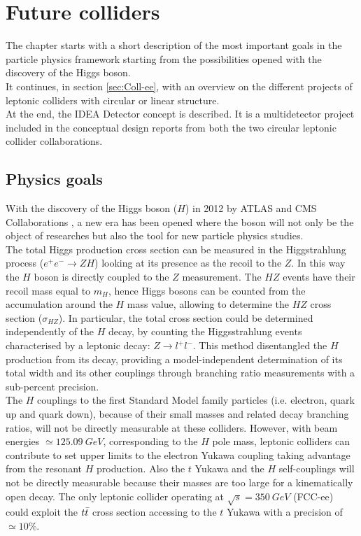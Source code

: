\chapter{Future colliders}
The chapter starts with a short description of the most important goals in the particle physics framework starting from the possibilities opened with the discovery of the Higgs boson.\\
It continues, in section \ref{sec:Coll-ee}, with an overview on the different projects of leptonic colliders with circular or linear structure.\\
At the end, the IDEA Detector concept is described. It is a multidetector project included in the conceptual design reports from both the two circular leptonic collider collaborations.

\section{Physics goals}
With the discovery of the Higgs boson ($H$) in 2012 by ATLAS and CMS Collaborations \cite{ATLAS_H, CMS_H}, a new era has been opened where the boson will not only be the object of researches but also the tool for new particle physics studies.\\

The total Higgs production cross section can be measured in the Higgstrahlung process ($e^+ e^- \rightarrow Z H$) looking at its presence as the recoil to the $Z$. In this way the $H$ boson is directly coupled to the $Z$ measurement.
The $H Z$ events have their recoil mass equal to $m_H$, hence Higgs bosons can be counted from the accumulation around the $H$ mass value, allowing to determine the $H Z$ cross section ($\sigma_{HZ}$).
In particular, the total cross section could be determined independently of the $H$ decay, by counting the Higgsstrahlung events characterised by a leptonic decay: $Z \rightarrow l^+ l^-$.
This method disentangled the $H$ production from its decay, providing a model-independent determination of its total width and its other couplings through branching ratio measurements with a sub-percent precision.\\

The $H$ couplings to the first Standard Model family particles (i.e. electron, quark up and quark down), because of their small masses and related decay branching ratios, will not be directly measurable at these colliders. 
However, with beam energies $\simeq 125.09\ GeV$, corresponding to the $H$ pole mass, leptonic colliders can contribute to set upper limits to the electron Yukawa coupling taking advantage from the resonant $H$ production.
Also the $t$ Yukawa and the $H$ self-couplings will not be directly measurable because their masses are too large for a kinematically open decay.
The only leptonic collider operating at $\sqrt{s} = 350\ GeV$ (FCC-ee) could exploit the $t\Bar{t}$ cross section accessing to the $t$ Yukawa with a precision of $\simeq 10\%$.\\

